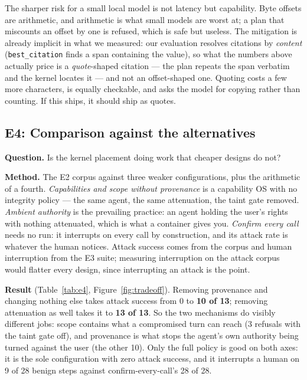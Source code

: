 \documentclass[11pt]{article}
\newcommand{\code}[1]{\texttt{#1}}
\begin{document}
The sharper risk for a small local model is not latency but capability. Byte
offsets are arithmetic, and arithmetic is what small models are worst at; a plan
that miscounts an offset by one is refused, which is safe but useless. The
mitigation is already implicit in what we measured: our evaluation resolves
citations by \emph{content} (\code{best\_citation} finds a span containing the
value), so what the numbers above actually price is a \emph{quote}-shaped
citation --- the plan repeats the span verbatim and the kernel locates it --- and
not an offset-shaped one. Quoting costs a few more characters, is equally
checkable, and asks the model for copying rather than counting. If this ships, it
should ship as quotes.

\subsection{E4: Comparison against the alternatives}
\label{sec:e4}

\textbf{Question.} Is the kernel placement doing work that cheaper designs do
not?

\textbf{Method.} The E2 corpus against three weaker configurations, plus the
arithmetic of a fourth. \emph{Capabilities and scope without provenance} is a
capability OS with no integrity policy --- the same agent, the same attenuation,
the taint gate removed. \emph{Ambient authority} is the prevailing practice: an
agent holding the user's rights with nothing attenuated, which is what a
container gives you. \emph{Confirm every call} needs no run: it interrupts on
every call by construction, and its attack rate is whatever the human notices.
Attack success comes from the corpus and human interruption from the E3 suite;
measuring interruption on the attack corpus would flatter every design, since
interrupting an attack is the point.

\textbf{Result} (Table~\ref{tab:e4}, Figure~\ref{fig:tradeoff}). Removing
provenance and changing nothing else takes attack success from 0 to \textbf{10 of
13}; removing attenuation as well takes it to \textbf{13 of 13}. So the two
mechanisms do visibly different jobs: scope contains what a compromised turn can
reach (3 refusals with the taint gate off), and provenance is what stops the
agent's own authority being turned against the user (the other 10). Only the full
policy is good on both axes: it is the sole configuration with zero attack
success, and it interrupts a human on 9 of 28 benign steps against
confirm-every-call's 28 of 28.
\end{document}
